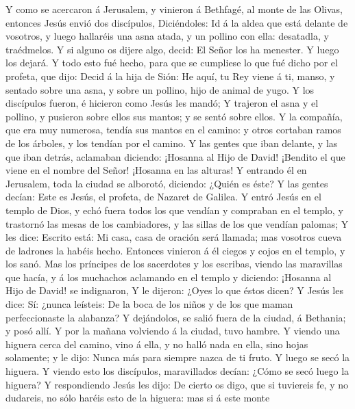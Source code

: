  Y como se acercaron á Jerusalem, y vinieron á Bethfagé, al
monte de las Olivas, entonces Jesús envió dos discípulos, 
Diciéndoles: Id á la aldea que está delante de vosotros, y luego
hallaréis una asna atada, y un pollino con ella: desatadla, y
traédmelos.  Y si alguno os dijere algo, decid: El Señor los
ha menester. Y luego los dejará.  Y todo esto fué hecho,
para que se cumpliese lo que fué dicho por el profeta, que dijo:
 Decid á la hija de Sión: He aquí, tu Rey viene á ti, manso,
y sentado sobre una asna, y sobre un pollino, hijo de animal de yugo.
 Y los discípulos fueron, é hicieron como Jesús les mandó;
 Y trajeron el asna y el pollino, y pusieron sobre ellos sus
mantos; y se sentó sobre ellos.  Y la compañía, que era muy
numerosa, tendía sus mantos en el camino: y otros cortaban ramos de los
árboles, y los tendían por el camino.  Y las gentes que iban
delante, y las que iban detrás, aclamaban diciendo: ¡Hosanna al Hijo de
David! ¡Bendito el que viene en el nombre del Señor! ¡Hosanna en las
alturas!  Y entrando él en Jerusalem, toda la ciudad se
alborotó, diciendo: ¿Quién es éste?  Y las gentes decían:
Este es Jesús, el profeta, de Nazaret de Galilea.  Y entró
Jesús en el templo de Dios, y echó fuera todos los que vendían y
compraban en el templo, y trastornó las mesas de los cambiadores, y las
sillas de los que vendían palomas;  Y les dice: Escrito
está: Mi casa, casa de oración será llamada; mas vosotros cueva de
ladrones la habéis hecho.  Entonces vinieron á él ciegos y
cojos en el templo, y los sanó.  Mas los príncipes de los
sacerdotes y los escribas, viendo las maravillas que hacía, y á los
muchachos aclamando en el templo y diciendo: ¡Hosanna al Hijo de David!
se indignaron,  Y le dijeron: ¿Oyes lo que éstos dicen? Y
Jesús les dice: Sí: ¿nunca leísteis: De la boca de los niños y de los
que maman perfeccionaste la alabanza?  Y dejándolos, se
salió fuera de la ciudad, á Bethania; y posó allí.  Y por
la mañana volviendo á la ciudad, tuvo hambre.  Y viendo una
higuera cerca del camino, vino á ella, y no halló nada en ella, sino
hojas solamente; y le dijo: Nunca más para siempre nazca de ti fruto. Y
luego se secó la higuera.  Y viendo esto los discípulos,
maravillados decían: ¿Cómo se secó luego la higuera?  Y
respondiendo Jesús les dijo: De cierto os digo, que si tuviereis fe, y
no dudareis, no sólo haréis esto de la higuera: mas si á este monte

